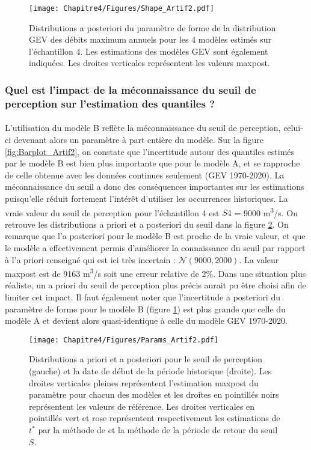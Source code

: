 	\begin{figure}[h]
		\centering
		\texttt{[image: Chapitre4/Figures/Shape\_Artif2.pdf]}	
		\caption{Distributions a posteriori du paramètre de forme de la distribution GEV des débits maximum annuels pour les 4 modèles estimés sur l'échantillon 4. Les estimations des modèles GEV sont également indiquées. Les droites verticales représentent les valeurs maxpost.}
		\label{fig:Shape_Artif2}
	\end{figure}

\FloatBarrier
	
	\subsubsection{Quel est l'impact de la méconnaissance du seuil de perception sur l'estimation des quantiles ?}
	
	\paragraph{} L'utilisation du modèle B reflète la méconnaissance du seuil de perception, celui-ci devenant alors un paramètre à part entière du modèle. Sur la figure \ref{fig:Barplot_Artif2}, on constate que l'incertitude autour des quantiles estimés par le modèle B est bien plus importante que pour le modèle A, et se rapproche de celle obtenue avec les données continues seulement (GEV 1970-2020). La méconnaissance du seuil a donc des conséquences importantes sur les estimations puisqu'elle réduit fortement l'intérêt d'utiliser les occurrences historiques. La vraie valeur du seuil de perception pour l'échantillon 4 est $S4$ = 9000 m\textsuperscript{3}/s. On retrouve les distributions a priori et a posteriori du seuil dans la figure \ref{fig:Params_Artif2}. On remarque que l'a posteriori pour le modèle B est proche de la vraie valeur, et que le modèle a effectivement permis d'améliorer la connaissance du seuil par rapport à l'a priori renseigné qui est ici très incertain : $\mathcal{N}(9000,2000)$. La valeur maxpost est de 9163 m\textsuperscript{3}/s soit une erreur relative de 2\%. Dans une situation plus réaliste, un a priori du seuil de perception plus précis aurait pu être choisi afin de limiter cet impact. Il faut également noter que l'incertitude a posteriori du paramètre de forme pour le modèle B (figure \ref{fig:Shape_Artif2}) est plus grande que celle du modèle A et devient alors quasi-identique à celle du modèle GEV 1970-2020. 
	
	 \begin{figure}[h]
		\centering
		\texttt{[image: Chapitre4/Figures/Params\_Artif2.pdf]}	
		\caption{Distributions a priori et a posteriori pour le seuil de perception (gauche) et la date de début de la période historique (droite). Les droites verticales pleines représentent l'estimation maxpost du paramètre pour chacun des modèles et les droites en pointillés noirs représentent les valeurs de référence. Les droites verticales en pointillés vert et rose représentent respectivement les estimations de $t^{*}$ par la méthode de \citet{prosdocimi_german_2018} et la méthode de la période de retour du seuil $S$.}
		\label{fig:Params_Artif2}
	\end{figure}
	
